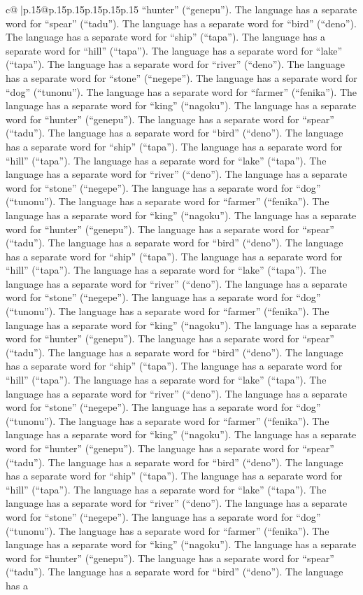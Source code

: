 \documentclass{article}
\begin{document}
{\begin{supertabular}{c@{$\;$}|p{.15\linewidth}@{}p{.15\linewidth}p{.15\linewidth}p{.15\linewidth}p{.15\linewidth}p{.15\linewidth}}
{{{“hunter” (“genepu”). The language has a separate word for “spear” (“tadu”). The language has a separate word for “bird” (“deno”). The language has a separate word for “ship” (“tapa”). The language has a separate word for “hill” (“tapa”). The language has a separate word for “lake” (“tapa”). The language has a separate word for “river” (“deno”). The language has a separate word for “stone” (“negepe”). The language has a separate word for “dog” (“tunonu”). The language has a separate word for “farmer” (“fenika”). The language has a separate word for “king” (“nagoku”). The language has a separate word for “hunter” (“genepu”). The language has a separate word for “spear” (“tadu”). The language has a separate word for “bird” (“deno”). The language has a separate word for “ship” (“tapa”). The language has a separate word for “hill” (“tapa”). The language has a separate word for “lake” (“tapa”). The language has a separate word for “river” (“deno”). The language has a separate word for “stone” (“negepe”). The language has a separate word for “dog” (“tunonu”). The language has a separate word for “farmer” (“fenika”). The language has a separate word for “king” (“nagoku”). The language has a separate word for “hunter” (“genepu”). The language has a separate word for “spear” (“tadu”). The language has a separate word for “bird” (“deno”). The language has a separate word for “ship” (“tapa”). The language has a separate word for “hill” (“tapa”). The language has a separate word for “lake” (“tapa”). The language has a separate word for “river” (“deno”). The language has a separate word for “stone” (“negepe”). The language has a separate word for “dog” (“tunonu”). The language has a separate word for “farmer” (“fenika”). The language has a separate word for “king” (“nagoku”). The language has a separate word for “hunter” (“genepu”). The language has a separate word for “spear” (“tadu”). The language has a separate word for “bird” (“deno”). The language has a separate word for “ship” (“tapa”). The language has a separate word for “hill” (“tapa”). The language has a separate word for “lake” (“tapa”). The language has a separate word for “river” (“deno”). The language has a separate word for “stone” (“negepe”). The language has a separate word for “dog” (“tunonu”). The language has a separate word for “farmer” (“fenika”). The language has a separate word for “king” (“nagoku”). The language has a separate word for “hunter” (“genepu”). The language has a separate word for “spear” (“tadu”). The language has a separate word for “bird” (“deno”). The language has a separate word for “ship” (“tapa”). The language has a separate word for “hill” (“tapa”). The language has a separate word for “lake” (“tapa”). The language has a separate word for “river” (“deno”). The language has a separate word for “stone” (“negepe”). The language has a separate word for “dog” (“tunonu”). The language has a separate word for “farmer” (“fenika”). The language has a separate word for “king” (“nagoku”). The language has a separate word for “hunter” (“genepu”). The language has a separate word for “spear” (“tadu”). The language has a separate word for “bird” (“deno”). The language has a }}}
\end{supertabular}}
\end{document}
